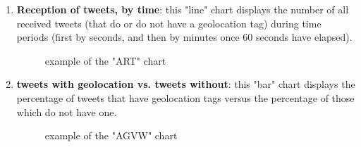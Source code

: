 \documentclass[a4paper,11pt]{report}
\begin{document}
\begin{enumerate}
\begin{enumerate}
		\item \textbf{Reception of tweets, by time}: this "line" chart displays the number of all received tweets (that do or do not have a geolocation tag) during time periods (first by seconds, and then by minutes once 60 seconds have elapsed).
		\begin{figure}[H]
		\vspace{-5pt}
		\begin{center}
		\vspace{-5pt}
		\caption{example of the "ART" chart}
		\end{center}
		\end{figure}
		\vspace{-10pt}

		\item \textbf{tweets with geolocation vs. tweets without}: this "bar" chart displays the percentage of tweets that have geolocation tags versus the percentage of those which do not have one.
		\begin{figure}[H]
		\vspace{-5pt}
		\begin{center}
		\vspace{-5pt}
		\caption{example of the "AGVW" chart}
		\end{center}
		\end{figure}
		\vspace{-10pt}
	 \end{enumerate}
\end{enumerate}
\end{document}
